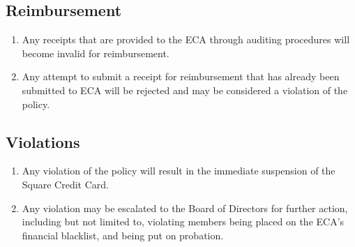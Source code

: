\documentclass[11pt]{article}
\begin{document}
    \subsection{Reimbursement}\label{subsec:reimbursement}
    \begin{enumerate}
        \begin{enumerate}
            \item Any receipts that are provided to the ECA through auditing procedures will become invalid for reimbursement.
            \item Any attempt to submit a receipt for reimbursement that has already been submitted to ECA will be rejected and may be considered a violation of the policy.
        \end{enumerate}
    \end{enumerate}

    \subsection{Violations}\label{subsec:violations}
    \begin{enumerate}
        \begin{enumerate}
            \item Any violation of the policy will result in the immediate suspension of the Square Credit Card.
            \item Any violation may be escalated to the Board of Directors for further action, including but not limited to, violating members being placed on the ECA's financial blacklist, and being put on probation.
        \end{enumerate}
    \end{enumerate}
\end{document}

